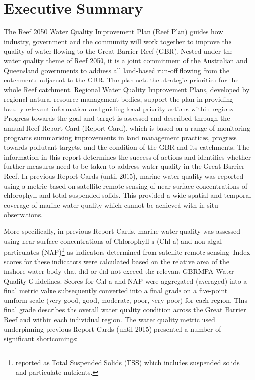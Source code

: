 \section{Executive Summary}



The Reef 2050 Water Quality Improvement Plan (Reef Plan) guides how industry, government and the
community will work together to improve the quality of water flowing to the Great Barrier Reef
(GBR). Nested under the water quality theme of Reef 2050, it is a joint commitment of the Australian
and Queensland governments to address all land-based run-off flowing from the catchments adjacent to
the GBR. The plan sets the strategic priorities for the whole Reef catchment. Regional Water Quality
Improvement Plans, developed by regional natural resource management bodies, support the plan in
providing locally relevant information and guiding local priority actions within regions Progress
towards the goal and target is assessed and described through the annual Reef Report Card (Report
Card), which is based on a range of monitoring programs summarising improvements in land management
practices, progress towards pollutant targets, and the condition of the GBR and its catchments. The
information in this report determines the success of actions and identifies whether further measures
need to be taken to address water quality in the Great Barrier Reef. In previous Report Cards (until
2015), marine water quality was reported using a metric based on satellite remote sensing of near
surface concentrations of chlorophyll and total suspended solids.  This provided a wide spatial and
temporal coverage of marine water quality which cannot be achieved with in situ observations.

More specifically, in previous Report Cards, marine water quality was assessed using near-surface
concentrations of Chlorophyll-a (Chl-a) and non-algal particulates (NAP)\footnote{reported as Total                                                                                                   
Suspended Solids (TSS) which includes suspended solids and particulate nutrients.} as indicators
determined from satellite remote sensing. Index scores for these indicators were calculated based on
the relative area of the inshore water body that did or did not exceed the relevant GBRMPA Water
Quality Guidelines. Scores for Chl-a and NAP were aggregated (averaged) into a final metric value
subsequently converted into a final grade on a five-point uniform scale (very good, good, moderate,
poor, very poor) for each region. This final grade describes the overall water quality condition
across the Great Barrier Reef and within each individual region.  The water quality metric used
underpinning previous Report Cards (until 2015) presented a number of significant shortcomings:

